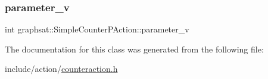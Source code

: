 \mbox{\label{classgraphsat_1_1_simple_counter_p_action_a7cd06392570e53eb0227974e96767ddc}} 
\subsubsection{\texorpdfstring{parameter\_v}{parameter\_v}}
{\footnotesize\ttfamily int graphsat\+::\+Simple\+Counter\+P\+Action\+::parameter\+\_\+v\hspace{0.3cm}{\ttfamily [private]}}



The documentation for this class was generated from the following file\+:\begin{DoxyCompactItemize}
\item 
include/action/\mbox{\hyperlink{counteraction_8h}{counteraction.\+h}}\end{DoxyCompactItemize}
